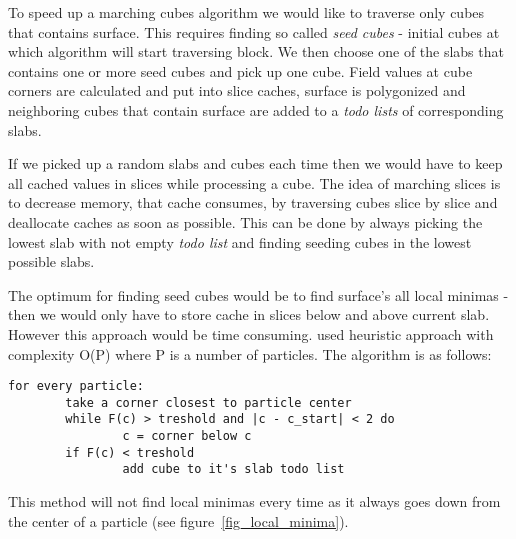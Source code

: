 
To speed up a marching cubes algorithm we would like to traverse only cubes that contains surface. This requires finding so called \textit{seed cubes} - initial cubes at which algorithm will start traversing block. We then choose one of the slabs that contains one or more seed cubes and pick up one cube. Field values at cube corners are calculated and put into slice caches, surface is polygonized and neighboring cubes that contain surface are added to a \textit{todo lists} of corresponding slabs. 

If we picked up a random slabs and cubes each time then we would have to keep all cached values in slices while processing a cube. The idea of marching slices is to decrease memory, that cache consumes, by traversing cubes slice by slice and deallocate caches as soon as possible. This can be done by always picking the lowest slab with not empty \textit{todo list} and finding seeding cubes in the lowest possible slabs. 

The optimum for finding seed cubes would be to find surface's all local minimas - then we would only have to store cache in slices below and above current slab. However this approach would be time consuming. \cite{RosenbergBirdwell2008} used heuristic approach with complexity O(P) where P is a number of particles. The algorithm is as follows:
\begin{verbatim}
for every particle:
        take a corner closest to particle center
        while F(c) > treshold and |c - c_start| < 2 do
                c = corner below c
        if F(c) < treshold
                add cube to it's slab todo list
\end{verbatim}

This method will not find local minimas every time as it always goes down from the center of a particle (see figure~\ref{fig_local_minima}).


